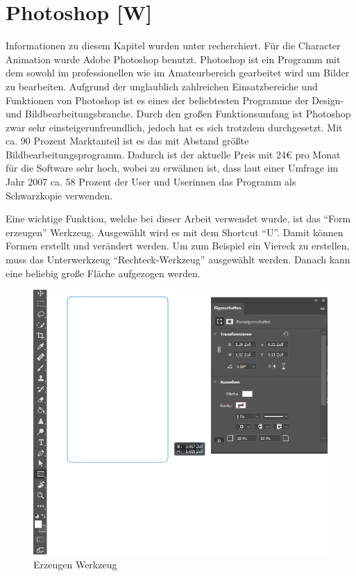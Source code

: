 \section{Photoshop [W]}
Informationen zu diesem Kapitel wurden unter \cite{photoshop} recherchiert.
Für die Character Animation wurde Adobe Photoshop benutzt. Photoshop ist ein Programm mit dem sowohl
im professionellen wie im Amateurbereich gearbeitet wird um Bilder zu bearbeiten.
Aufgrund der unglaublich zahlreichen Einsatzbereiche und Funktionen von Photoshop ist es
eines der beliebtesten Programme der Design- und Bildbearbeitungsbranche.
Durch den großen Funktionsumfang ist Photoshop zwar sehr einsteigerunfreundlich, jedoch
hat es sich trotzdem durchgesetzt. Mit ca. 90 Prozent Marktanteil ist es das mit Abstand größte
Bildbearbeitungsprogramm. Dadurch ist der aktuelle Preis mit 24€ pro Monat für die Software sehr hoch, wobei zu erwähnen ist,
dass laut einer Umfrage im Jahr 2007 ca. 58 Prozent der User und Userinnen das Programm als Schwarzkopie verwenden.

Eine wichtige Funktion, welche bei dieser Arbeit verwendet wurde, ist das ``Form erzeugen'' Werkzeug. Ausgewählt wird es mit dem Shortcut ``U''. Damit können Formen erstellt und verändert werden. Um zum Beispiel ein Viereck zu erstellen, muss das Unterwerkzeug ``Rechteck-Werkzeug'' ausgewählt werden. Danach
kann eine beliebig große Fläche aufgezogen werden.
\begin{figure}[H]
  \centering
  \includegraphics[scale=0.7]{pics/erzeugen.png}
  \caption{Erzeugen Werkzeug}
\end{figure}

